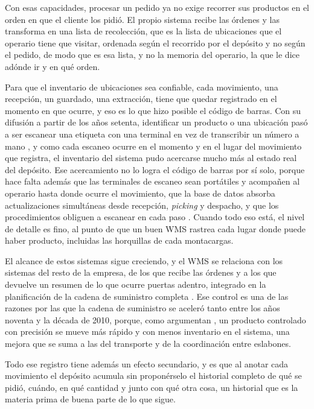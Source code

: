 Con esas capacidades, procesar un pedido ya no exige recorrer sus productos en el orden en que el cliente los pidió.
El propio sistema recibe las órdenes y las transforma en una lista de recolección, que es la lista de ubicaciones que el operario tiene que visitar, ordenada según el recorrido por el depósito y no según el pedido, de modo que es esa lista, y no la memoria del operario, la que le dice adónde ir y en qué orden.

Para que el inventario de ubicaciones sea confiable, cada movimiento, una recepción, un guardado, una extracción, tiene que quedar registrado en el momento en que ocurre, y eso es lo que hizo posible el código de barras.
Con su difusión a partir de los años setenta, identificar un producto o una ubicación pasó a ser escanear una etiqueta con una terminal en vez de transcribir un número a mano \citep{brown1997revolution}, y como cada escaneo ocurre en el momento y en el lugar del movimiento que registra, el inventario del sistema pudo acercarse mucho más al estado real del depósito.
Ese acercamiento no lo logra el código de barras por sí solo, porque hace falta además que las terminales de escaneo sean portátiles y acompañen al operario hasta donde ocurre el movimiento, que la base de datos absorba actualizaciones simultáneas desde recepción, \emph{picking} y despacho, y que los procedimientos obliguen a escanear en cada paso \citep[sección~4.2]{bartholdi2014warehouse}.
Cuando todo eso está, el nivel de detalle es fino, al punto de que un buen WMS rastrea cada lugar donde puede haber producto, incluidas las horquillas de cada montacargas.

El alcance de estos sistemas sigue creciendo, y el WMS se relaciona con los sistemas del resto de la empresa, de los que recibe las órdenes y a los que devuelve un resumen de lo que ocurre puertas adentro, integrado en la planificación de la cadena de suministro completa \citep[capítulo~4]{bartholdi2014warehouse}.
Ese control es una de las razones por las que la cadena de suministro se aceleró tanto entre los años noventa y la década de 2010, porque, como argumentan \citet[capítulo~4]{bartholdi2014warehouse}, un producto controlado con precisión se mueve más rápido y con menos inventario en el sistema, una mejora que se suma a las del transporte y de la coordinación entre eslabones.

Todo ese registro tiene además un efecto secundario, y es que al anotar cada movimiento el depósito acumula sin proponérselo el historial completo de qué se pidió, cuándo, en qué cantidad y junto con qué otra cosa, un historial que es la materia prima de buena parte de lo que sigue.

